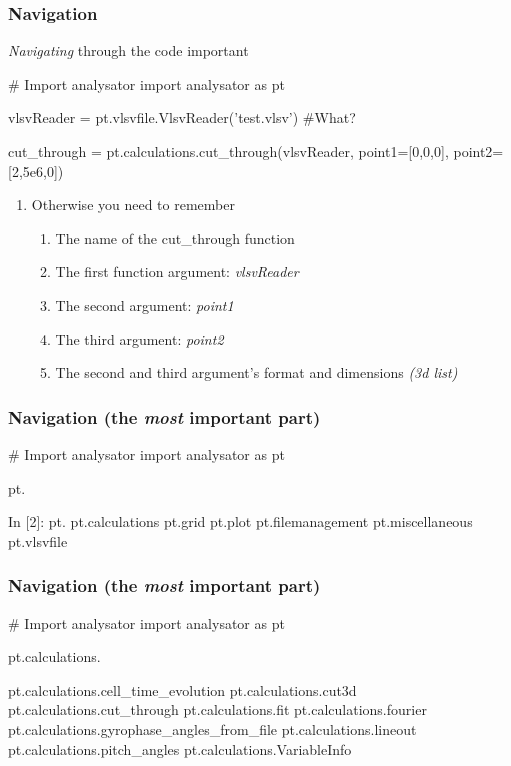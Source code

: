\documentclass{beamer}
\begin{document}
\begin{frame}[fragile]
 \frametitle{Navigation}
 
 \emph{Navigating} through the code important
 
 \begin{python}[basicstyle=\tiny]
  # Import analysator
  import analysator as pt
  
  vlsvReader = pt.vlsvfile.VlsvReader('test.vlsv') #What?
  
  cut_through = pt.calculations.cut_through(vlsvReader, point1=[0,0,0], point2=[2,5e6,0])
 \end{python}
 
 \begin{enumerate}
  \item Otherwise you need to remember
  \begin{enumerate}
   \item The name of the cut\_through function
   \item The first function argument: \emph{vlsvReader}
   \item The second argument: \emph{point1}
   \item The third argument: \emph{point2}
   \item The second and third argument's format and dimensions \emph{(3d list)}
  \end{enumerate}
 \end{enumerate}

\end{frame}



\begin{frame}[fragile]
 \frametitle{Navigation (the \emph{most} important part)}
 \begin{python}[basicstyle=\tiny]
  # Import analysator
  import analysator as pt
  
  pt.
 \end{python}
 \begin{python}[basicstyle=\tiny]
In [2]: pt.
pt.calculations    pt.grid            pt.plot            
pt.filemanagement  pt.miscellaneous   pt.vlsvfile    
 \end{python}
\end{frame}

\begin{frame}[fragile]
 \frametitle{Navigation (the \emph{most} important part)}
 \begin{python}[basicstyle=\tiny]
  # Import analysator
  import analysator as pt
  
  pt.calculations.
 \end{python}
 \begin{python}[basicstyle=\tiny]
pt.calculations.cell_time_evolution
pt.calculations.cut3d
pt.calculations.cut_through
pt.calculations.fit
pt.calculations.fourier
pt.calculations.gyrophase_angles_from_file
pt.calculations.lineout
pt.calculations.pitch_angles
pt.calculations.VariableInfo
 \end{python}
\end{frame}
\end{document}
